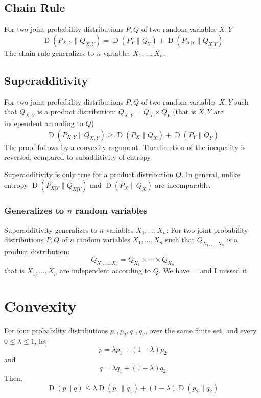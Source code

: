 \documentclass{article}
\begin{document}
\subsection{Chain Rule}

For two joint probability distributions $P,Q$ of two random variables $X,Y$
\[
\operatorname{D}\left(P_{X,Y}\| Q_{X,Y}\right) = \operatorname{D}\left(P_Y\| Q_Y\right) + \operatorname{D}\left(P_{X|Y}\| Q_{X|Y}\right)
\]
The chain rule generalizes to $n$ variables $X_1,\ldots, X_n$.

\subsection{Superadditivity}

For two joint probability distributions $P,Q$ of two random variables $X,Y$ such that $Q_{X,Y}$ is a product distribution: $Q_{X,Y} = Q_X \times Q_Y$ (that is $X,Y$ are independent according to $Q$)
\[
\operatorname{D}\left(P_{X,Y}\| Q_{X,Y}\right) \geq \operatorname{D}\left(P_{X}\| Q_{X}\right)  + \operatorname{D}\left(P_{Y}\| Q_{Y}\right) 
\]
The proof follows by a convexity argument. The direction of the inequality is reversed, compared to subadditivity of entropy.

Superadditivity is only true for a product distribution $Q$. In general, unlike entropy $\operatorname{D}\left(P_{X|Y}\| Q_{X|Y}\right)$ and $\operatorname{D}\left(P_{X}\| Q_{X}\right)$ are incomparable.

\subsubsection{Generalizes to $n$ random variables}

Superadditivity generalizes to $n$ variables $X_1,\ldots, X_n$: For two joint probability distributions $P,Q$ of $n$ random variables $X_1,\ldots, X_n$ such that $Q_{X_1,\ldots,X_n}$ is a product distribution:
\[
Q_{X_1,\ldots,X_n} = Q_{X_1}\times \cdots \times Q_{X_n}
\]
that is $X_1,\ldots, X_n$ are independent according to $Q$. We have ... and I missed it.

\section{Convexity}

For four probability distributions $p_1,p_2,q_1,q_2$, over the same finite set, and every $0\leq \lambda \leq 1$, let 
\[
p=\lambda p_1 + (1-\lambda) p_2
\]
and 
\[
q= \lambda q_1 + (1-\lambda) q_2
\]
Then,
\[
\operatorname{D}\left(p\| q\right) \leq \lambda \operatorname{D}\left(p_1\| q_1\right)+ (1-\lambda)\operatorname{D}\left(p_2\| q_2\right)
\]
\end{document}

